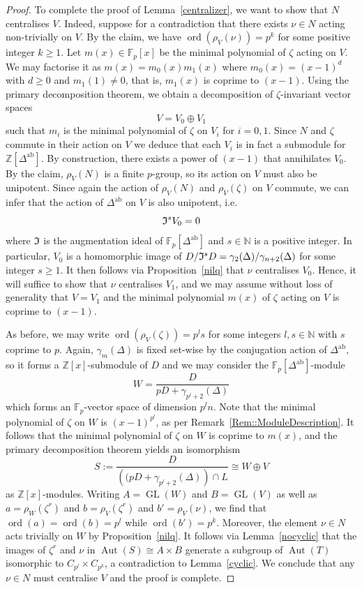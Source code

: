 \documentclass{amsart}
\numberwithin{theorem}{section}
\numberwithin{equation}{section}
\newcommand{\Z}{\mathbb{Z}}
\begin{document}
\begin{proof}
To complete the proof of Lemma~\ref{centralizer}, we want to show that $N$ centralises $V$. Indeed, suppose for a contradiction that there exists $\nu \in N$ acting non-trivially on $V$. By the claim, we have $\operatorname{ord}(\rho_V(\nu)) = p^k$ for some positive integer $k \geq 1$. Let $m(x) \in \mathbb F_p[x]$ be the minimal polynomial of $\zeta$ acting on $V$. We may factorise it as $m(x)=m_0(x) m_1(x)$ where $m_0(x)=(x-1)^d$ with $ d \geq 0$ and $m_1(1) \neq 0$, that is, $m_1(x)$ is coprime to $(x-1)$. Using the primary decomposition theorem, we obtain a decomposition of $\zeta$-invariant vector spaces \[V=V_0 \oplus V_1\] such that $m_i$ is the minimal polynomial of $\zeta$ on $V_i$ for $i = 0,1$. Since $N$ and $\zeta$ commute in their action on $V$ we deduce that each $V_i$ is in fact a submodule for $\Z[\Delta^\mathrm{ab}]$. By construction, there exists a power of $(x-1)$ that annihilates $V_0$. By the claim, $\rho_V(N)$ is a finite $p$-group, so its action on $V$ must also be unipotent. Since again the action of $\rho_V(N)$ and $\rho_V(\zeta)$ on $V$ commute, we can infer that the action of $\Delta^\mathrm{ab}$ on $V$ is also unipotent, i.e.
\[
\frak{I}^s V_0 = 0 
\] where $\frak{I}$ is the augmentation ideal of $\mathbb{F}_p[\Delta^\mathrm{ab}]$ and $s \in \mathbb{N}$ is a positive integer. In particular, $V_0$ is a homomorphic image of $D/\frak{I}^s D = \gamma_2(\Delta)/\gamma_{n+2}(\Delta)$ for some integer $s \geq 1$. It then follows via Proposition~\ref{nilq} that $\nu$ centralises $V_0$. Hence, it will suffice to show that $\nu$ centralises $V_1$, and we may assume without loss of generality that $V=V_1$ and the minimal polynomial $m(x)$ of $\zeta$ acting on $V$ is coprime to $(x-1)$.

As before, we may write $\operatorname{ord}(\rho_V(\zeta)) = p^l s$ for some integers $l,s \in \mathbb{N}$ with $s$ coprime to $p$. Again, $\gamma_m(\Delta)$ is fixed set-wise by the conjugation action of $\Delta^\mathrm{ab}$, so it forms a $\mathbb{Z}[x]$-submodule of $D$ and we may consider the $\mathbb{F}_p[\Delta^\mathrm{ab}]$-module
\[
W = \frac{D}{pD+\gamma_{p^l+2}(\Delta)}
\] which forms an $\mathbb{F}_p$-vector space of dimension $p^ln$. Note that the minimal polynomial of $\zeta$ on $W$ is $(x-1)^{p^l}$, as per Remark~\ref{Rem::ModuleDescription}. It follows that the minimal polynomial of $\zeta$ on $W$ is coprime to $m(x)$, and the primary decomposition theorem yields an isomorphism
\[
S:=\frac{D}{\left((pD+\gamma_{p^l+2}(\Delta)\right) \cap L} \cong W \oplus V
\] as $\Z[x]$-modules. Writing $ A = \operatorname{GL}(W)$ and $B = \operatorname{GL}(V)$ as well as $a = \rho_W(\zeta^r)$ and $b = \rho_V(\zeta^r)$ and $b' = \rho_V(\nu)$, we find that $\operatorname{ord}(a) = \operatorname{ord}(b) = p^l$ while $\operatorname{ord}(b') = p^k$. Moreover, the element $\nu \in N$ acts trivially on $W$ by Proposition~\ref{nilq}. It follows via Lemma~\ref{nocyclic} that the images of $\zeta^r$ and $\nu$ in $\operatorname{Aut}(S) \cong A \times B$ generate a subgroup of $\operatorname{Aut}(T)$ isomorphic to $C_{p^l} \times C_{p^k}$, a contradiction to Lemma~\ref{cyclic}. We conclude that any $\nu \in N$ must centralise $V$ and the proof is complete.
\end{proof}
\end{document}
